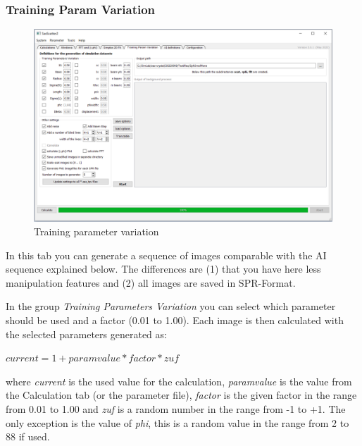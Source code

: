 \documentclass[11pt]{article} %
\begin{document}
\subsubsection{Training Param Variation}
\begin{figure}[H]
 \centering
 \includegraphics[width=\textwidth]{gui-tpv.png}
 \caption{Training parameter variation}
\end{figure}

In this tab you can generate a sequence of images comparable with the AI sequence explained below. The differences are (1) that you have here less manipulation features and (2) all images are saved in SPR-Format.

In the group {\it Training Parameters Variation} you can select which parameter should be used and a factor (0.01 to 1.00). Each image is then calculated with the selected parameters generated as: \\
\centerline{$current = 1 + paramvalue * factor * zuf$}
where {\it current} is the used value for the calculation, {\it paramvalue} is the value from the Calculation tab (or the parameter file), {\it factor} is the given factor in the range from 0.01 to 1.00 and {\it zuf} is a random number in the range from -1 to +1. The only exception is the value of {\it phi}, this is a random value in the range from 2 to 88 if used.
\end{document}
